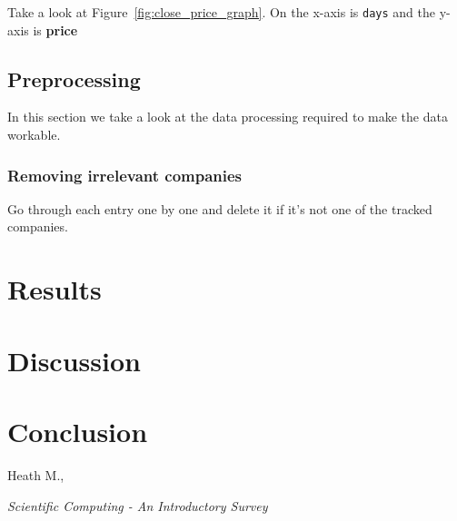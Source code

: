 \documentclass[8pt]{article}
\begin{document}
	Take a look at Figure~\ref{fig:close_price_graph}. On the x-axis is
	\texttt{days} and the y-axis is \textbf{price}
	\subsection{Preprocessing}
	In this section we take a look at the data processing required to make the
	data workable.
		\subsubsection{Removing irrelevant companies}
		Go through each entry one by one and delete it if it's not one of the tracked companies.

	\section{Results}
	\section{Discussion}
	\section{Conclusion}
	\begin{thebibliography}{9}
			Heath M.,

			\textit{Scientific Computing - An Introductory Survey}
	\end{thebibliography}
\end{document}
